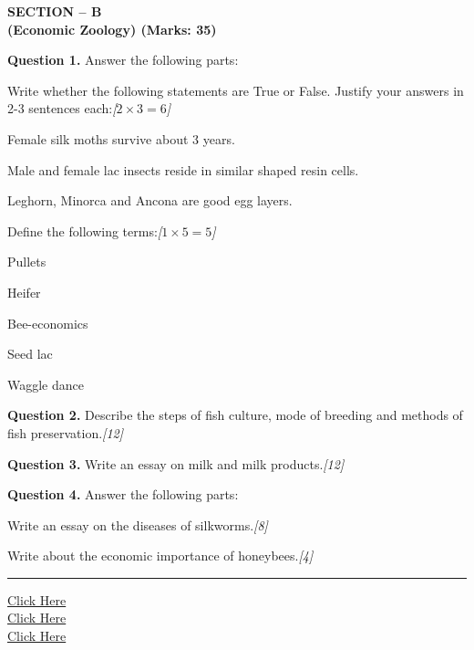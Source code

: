 \documentclass[11pt,a4paper]{article}
\newcommand{\pts}[1]{\hfill   \textit{[#1]}}
\begin{document}
\bigskip

\begin{center}
   \textbf{SECTION -- B} \\
   \textbf{(Economic Zoology) (Marks: 35)}
\end{center}

\medskip


\noindent   \textbf{Question 1.} Answer the following parts:

\begin{parts}
  \item Write whether the following statements are True or False. Justify your answers in 2-3 sentences each:\pts{$2  \times 3 = 6$}
  
\begin{parts}
    \item Female silk moths survive about 3 years.
    \item Male and female lac insects reside in similar shaped resin cells.
    \item Leghorn, Minorca and Ancona are good egg layers.
  \end{parts}
  
  \item Define the following terms:\pts{$1  \times 5 = 5$}
  
\begin{parts}
    \item Pullets
    \item Heifer
    \item Bee-economics
    \item Seed lac
    \item Waggle dance
  \end{parts}
\end{parts}

\medskip


\noindent   \textbf{Question 2.} Describe the steps of fish culture, mode of breeding and methods of fish preservation.\pts{12}

\medskip


\noindent   \textbf{Question 3.} Write an essay on milk and milk products.\pts{12}

\medskip


\noindent   \textbf{Question 4.} Answer the following parts:

\begin{parts}
  \item Write an essay on the diseases of silkworms.\pts{8}
  \item Write about the economic importance of honeybees.\pts{4}
\end{parts}

\vfill
\rule{\linewidth}{0.4pt}

\begin{center}\small
\href{https://bhu-exam.vercel.app/}{Click Here}\\[4pt]\href{https://me-aryan.vercel.app/}{Click Here}\\[4pt]\href{https://quashan-me.vercel.app/}{Click Here}
\end{center}
\end{document}
